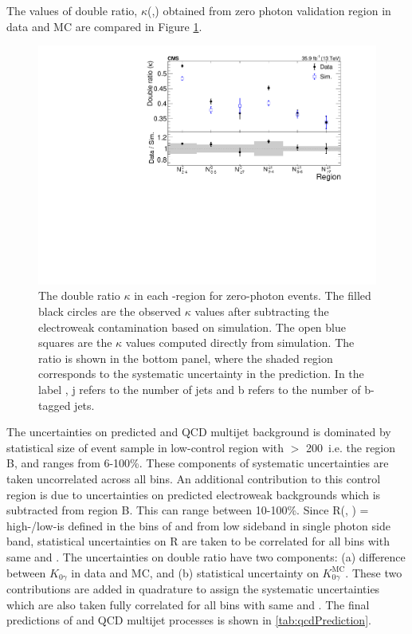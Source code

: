 The values of double ratio, $\kappa$(\nj,\nb) obtained from zero photon validation region in data and MC are compared in Figure \ref{fig:Figure_003}.
\begin{figure}[h!]
\centering
\includegraphics[width=0.8\linewidth]{../Figures/Chap3/anaPublic/Figure_003}
\caption[Double ratio validation]{The double ratio $\kappa$ in each \nj-\nb region for
zero-photon events. The filled black circles are the observed $\kappa$ values after subtracting
the electroweak contamination based on simulation. The open blue squares are the
$\kappa$ values computed directly from simulation.  The ratio is shown in the bottom
panel, where the shaded region corresponds to the systematic uncertainty in the \gjets prediction.
In the label \njb, j refers to the number of jets and b refers to the number of b-tagged jets.}
\label{fig:Figure_003}
\end{figure}

The uncertainties on predicted \gjets and QCD multijet background is dominated by statistical size of event sample in low-\dphi control region with \ptmiss $>$ 200~\gev i.e. the region B, and ranges from 6-100\%. These components of systematic uncertainties are taken uncorrelated across all bins. An additional contribution to this control region is due to uncertainties on predicted electroweak backgrounds which is subtracted from region B. This can range between 10-100\%.  Since R(\nj, \nb) = high-\dphi/low-\dphi is defined in the bins of \nj and \nb from low \ptmiss sideband in single photon side band, statistical uncertainties on R are taken to be correlated for all bins with same \nj and \nb. The uncertainties on double ratio have two components: (a) difference between $K_{0\gamma}$ in data and MC, and (b) statistical uncertainty on $K_{0\gamma}^{\text{MC}}$. These two contributions are added in quadrature to assign the systematic uncertainties which are also taken fully correlated for all bins with same \nj and \nb.
The final predictions of \gjets and QCD multijet processes is shown in \ref{tab:qcdPrediction}.

